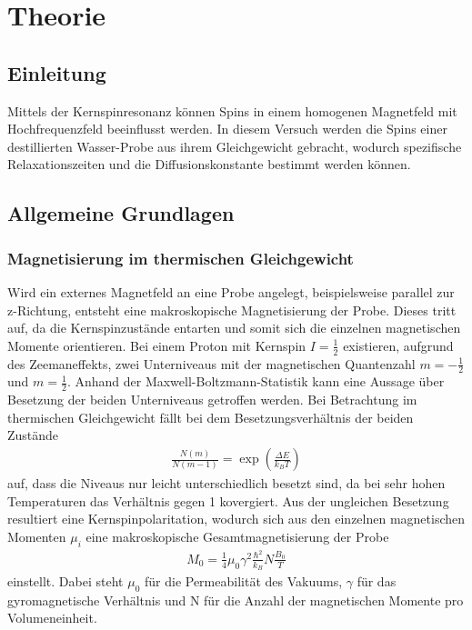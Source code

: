 \section{Theorie}
\label{sec:Theorie}
\subsection{Einleitung}
Mittels der Kernspinresonanz können Spins in einem homogenen Magnetfeld mit Hochfrequenzfeld beeinflusst werden. In diesem Versuch werden die Spins einer destillierten Wasser-Probe aus ihrem Gleichgewicht gebracht, wodurch spezifische Relaxationszeiten und die Diffusionskonstante bestimmt werden können.
\subsection{Allgemeine Grundlagen}
\subsubsection{Magnetisierung im thermischen Gleichgewicht}
Wird ein externes Magnetfeld an eine Probe angelegt, beispielsweise parallel zur z-Richtung, entsteht eine makroskopische Magnetisierung der Probe. Dieses tritt auf, da die Kernspinzustände entarten und somit sich die einzelnen magnetischen Momente orientieren. Bei einem Proton mit Kernspin $I=\frac{1}{2}$ existieren, aufgrund des Zeemaneffekts, zwei Unterniveaus mit der magnetischen Quantenzahl $m=-\frac{1}{2}$ und $m=\frac{1}{2}$. Anhand der Maxwell-Boltzmann-Statistik kann eine Aussage über Besetzung der beiden Unterniveaus getroffen werden. Bei Betrachtung im thermischen Gleichgewicht fällt bei dem Besetzungsverhältnis der beiden Zustände
\begin{align}
	\frac{N(m)}{N(m-1)}=\exp{\left(\frac{\Delta E}{k_BT}\right)}
	\label{eq:verhaeltniss}
\end{align}
auf, dass die Niveaus nur leicht unterschiedlich besetzt sind, da bei sehr hohen Temperaturen das Verhältnis gegen 1 kovergiert. Aus der ungleichen Besetzung resultiert eine Kernspinpolaritation, wodurch sich aus den einzelnen magnetischen Momenten $\mu_i$ eine makroskopische Gesamtmagnetisierung der Probe 
\begin{align}
	M_0 = \frac{1}{4}\mu_0\gamma^2\frac{\hbar^2}{k_B}N\frac{B_0}{T}
	\label{eq:gleichgewicht}
\end{align}
einstellt. Dabei steht $\mu_0$ für die Permeabilität des Vakuums, $\gamma$ für das gyromagnetische Verhältnis und N für die Anzahl der magnetischen Momente pro Volumeneinheit.

